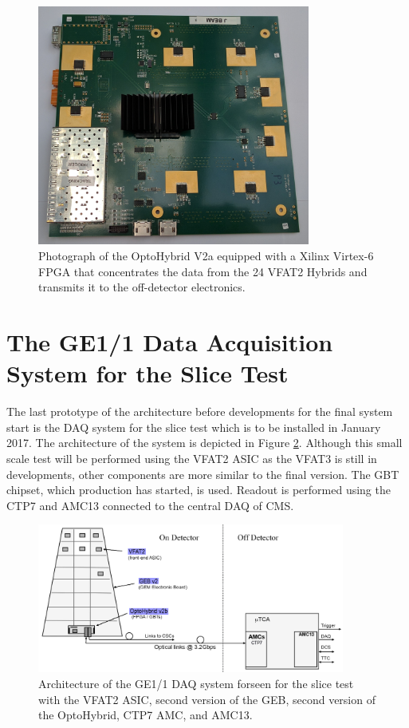      \begin{figure}[h!]
        \centering
        \includegraphics[width=0.8\textwidth]{img/II-2-daq/oh-v2a.jpg}
        \caption{Photograph of the OptoHybrid V2a equipped with a Xilinx Virtex-6 FPGA that concentrates the data from the 24 VFAT2 Hybrids and transmits it to the off-detector electronics.}
        \label{fig:II-2-ohv2a}
      \end{figure}

  \section{The GE1/1 Data Acquisition System for the Slice Test}

    The last prototype of the architecture before developments for the final system start is the DAQ system for the slice test which is to be installed in January 2017. The architecture of the system is depicted in Figure \ref{fig:II-2-gem-system-v2b}. Although this small scale test will be performed using the VFAT2 ASIC as the VFAT3 is still in developments, other components are more similar to the final version. The GBT chipset, which production has started, is used. Readout is performed using the CTP7 and AMC13 connected to the central DAQ of CMS.

    \begin{figure}[h!]
      \centering
      \includegraphics[width=0.9\textwidth]{img/II-2-daq/gem-system-v2b.pdf}
      \caption{Architecture of the GE1/1 DAQ system forseen for the slice test with the VFAT2 ASIC, second version of the GEB, second version of the OptoHybrid, CTP7 AMC, and AMC13.}
      \label{fig:II-2-gem-system-v2b}
    \end{figure}

